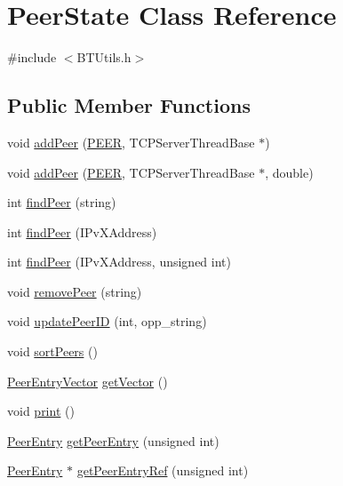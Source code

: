 \hypertarget{classPeerState}{}\section{Peer\+State Class Reference}
\label{classPeerState}


{\ttfamily \#include $<$B\+T\+Utils.\+h$>$}

\subsection*{Public Member Functions}
\begin{DoxyCompactItemize}
\item 
void \hyperlink{classPeerState_abcf9aab5e943f87e78b15d4e0f8c2eff}{add\+Peer} (\hyperlink{structPEER}{P\+E\+E\+R}, T\+C\+P\+Server\+Thread\+Base $\ast$)
\item 
void \hyperlink{classPeerState_a1c100faee655ba7d937f425228e788dc}{add\+Peer} (\hyperlink{structPEER}{P\+E\+E\+R}, T\+C\+P\+Server\+Thread\+Base $\ast$, double)
\item 
int \hyperlink{classPeerState_acdef140ea86d90b8316bb47b115193de}{find\+Peer} (string)
\item 
int \hyperlink{classPeerState_a7870e82a269cee5a2fa118bf518dc829}{find\+Peer} (I\+Pv\+X\+Address)
\item 
int \hyperlink{classPeerState_a750b687f72ad5c1c19b04217c8840b56}{find\+Peer} (I\+Pv\+X\+Address, unsigned int)
\item 
void \hyperlink{classPeerState_ada531732fc1e97467a9eba46c411a6f9}{remove\+Peer} (string)
\item 
void \hyperlink{classPeerState_a6237759c93d6de6d5d4626f8e9f5194f}{update\+Peer\+I\+D} (int, opp\+\_\+string)
\item 
void \hyperlink{classPeerState_ad344aaae448c271ccb803693207413da}{sort\+Peers} ()
\item 
\hyperlink{BTUtils_8h_a5088ee9871539d4eb966586338bbed6f}{Peer\+Entry\+Vector} \hyperlink{classPeerState_a17e1859e95d50d72dfb7e9e0d45db230}{get\+Vector} ()
\item 
void \hyperlink{classPeerState_a112c1e60241207adf7d213cf6873105e}{print} ()
\item 
\hyperlink{classPeerEntry}{Peer\+Entry} \hyperlink{classPeerState_aaef15b31facf166ce583263a9161b6b9}{get\+Peer\+Entry} (unsigned int)
\item 
\hyperlink{classPeerEntry}{Peer\+Entry} $\ast$ \hyperlink{classPeerState_a9e305e522559cb0cccdde6dab89c86fb}{get\+Peer\+Entry\+Ref} (unsigned int)

\end{DoxyCompactItemize}

